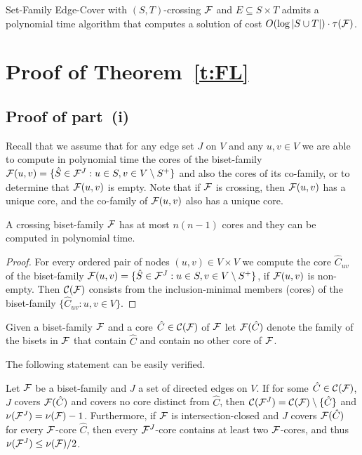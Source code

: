 \begin{corollary}
{\sf Set-Family Edge-Cover} with $(S,T)$-crossing ${\cal F}$ and $E \subseteq S \times T$ 
admits a polynomial time algorithm that computes a solution of cost 
$O(\log |S \cup T|) \cdot \tau({\cal F})$. 
\end{corollary}


\section{Proof of Theorem~\ref{t:FL}}

\subsection{Proof of part~(i)}

Recall that we assume that for any edge set $J$ on $V$ and any $u,v \in V$ we are able to compute 
in polynomial time the cores of the biset-family 
${\cal F}(u,v)=\{\hat{S} \in {\cal F}^J: u \in S, v \in V \setminus S^+\}$ 
and also the cores of its co-family, or to determine that ${\cal F}(u,v)$ is empty.
Note that if ${\cal F}$ is crossing, then ${\cal F}(u,v)$ has a unique core, and the 
co-family of ${\cal F}(u,v)$ also has a unique core.

 \begin{lemma} \label{l:poly}
A crossing biset-family ${\cal F}$ has at most $n(n-1)$ cores and they can be computed in polynomial time.
\end{lemma}
\begin{proof}
For every ordered pair of nodes $(u,v) \in V \times V$ we compute the core $\hat{C}_{uv}$ 
of the biset-family ${\cal F}(u,v)=\{\hat{S} \in {\cal F}^J: u \in S, v \in V \setminus S^+\}$, 
if ${\cal F}(u,v)$ is non-empty.
Then ${\cal C}({\cal F})$ consists from the inclusion-minimal members (cores) 
of the biset-family $\{\hat{C}_{uv}: u,v \in V\}$. 
\end{proof}

\begin{definition}
Given a biset-family ${\cal F}$ and a core $\hat{C} \in {\cal C}({\cal F})$ of ${\cal F}$ 
let ${\cal F}(\hat{C})$ denote the family 
of the bisets in ${\cal F}$ that contain $\hat{C}$ and contain no other core of ${\cal F}$. 
\end{definition}

The following statement can be easily verified. 

\begin{claim} \label{c:iterative-merging}
Let ${\cal F}$ be a biset-family and $J$ a set of directed edges on $V$.
If for some $\hat{C} \in {\cal C}({\cal F})$,
$J$ covers ${\cal F}(\hat{C})$ and covers no core distinct from $\hat{C}$, 
then ${\cal C}({\cal F}^J)={\cal C}({\cal F}) \setminus \{\hat{C}\}$ and 
$\nu({\cal F}^J) = \nu({\cal F})-1$.
Furthermore, if ${\cal F}$ is intersection-closed and $J$ covers ${\cal F}(\hat{C})$ 
for every ${\cal F}$-core $\hat{C}$, 
then every ${\cal F}^J$-core contains at least two ${\cal F}$-cores, 
and thus $\nu({\cal F}^J) \leq \nu({\cal F})/2$.
\end{claim}


